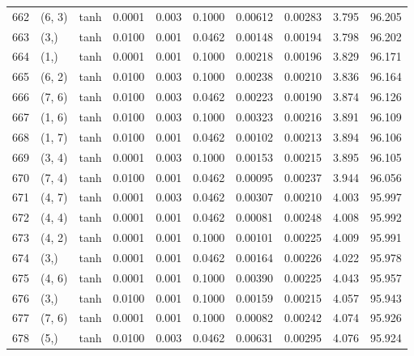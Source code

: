 \begin{tabular}{lllrrrrrrr}
662 &      (6, 3) &      tanh &  0.0001 &  0.003 &  0.1000 &          0.00612 &    0.00283 &       3.795 &    96.205 \\
663 &        (3,) &      tanh &  0.0100 &  0.001 &  0.0462 &          0.00148 &    0.00194 &       3.798 &    96.202 \\
664 &        (1,) &      tanh &  0.0001 &  0.001 &  0.1000 &          0.00218 &    0.00196 &       3.829 &    96.171 \\
665 &      (6, 2) &      tanh &  0.0100 &  0.003 &  0.1000 &          0.00238 &    0.00210 &       3.836 &    96.164 \\
666 &      (7, 6) &      tanh &  0.0100 &  0.003 &  0.0462 &          0.00223 &    0.00190 &       3.874 &    96.126 \\
667 &      (1, 6) &      tanh &  0.0100 &  0.003 &  0.1000 &          0.00323 &    0.00216 &       3.891 &    96.109 \\
668 &      (1, 7) &      tanh &  0.0100 &  0.001 &  0.0462 &          0.00102 &    0.00213 &       3.894 &    96.106 \\
669 &      (3, 4) &      tanh &  0.0001 &  0.003 &  0.1000 &          0.00153 &    0.00215 &       3.895 &    96.105 \\
670 &      (7, 4) &      tanh &  0.0100 &  0.001 &  0.0462 &          0.00095 &    0.00237 &       3.944 &    96.056 \\
671 &      (4, 7) &      tanh &  0.0001 &  0.003 &  0.0462 &          0.00307 &    0.00210 &       4.003 &    95.997 \\
672 &      (4, 4) &      tanh &  0.0001 &  0.001 &  0.0462 &          0.00081 &    0.00248 &       4.008 &    95.992 \\
673 &      (4, 2) &      tanh &  0.0001 &  0.001 &  0.1000 &          0.00101 &    0.00225 &       4.009 &    95.991 \\
674 &        (3,) &      tanh &  0.0001 &  0.001 &  0.0462 &          0.00164 &    0.00226 &       4.022 &    95.978 \\
675 &      (4, 6) &      tanh &  0.0001 &  0.001 &  0.1000 &          0.00390 &    0.00225 &       4.043 &    95.957 \\
676 &        (3,) &      tanh &  0.0100 &  0.001 &  0.1000 &          0.00159 &    0.00215 &       4.057 &    95.943 \\
677 &      (7, 6) &      tanh &  0.0001 &  0.001 &  0.1000 &          0.00082 &    0.00242 &       4.074 &    95.926 \\
678 &        (5,) &      tanh &  0.0100 &  0.003 &  0.0462 &          0.00631 &    0.00295 &       4.076 &    95.924 \\

\end{tabular}
